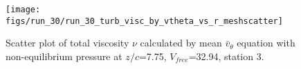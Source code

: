 \begin{figure}[H]
\centering
\texttt{[image: figs/run\_30/run\_30\_turb\_visc\_by\_vtheta\_vs\_r\_meshscatter]}
\caption{Scatter plot of total viscosity $\nu$ calculated by mean $\bar{v}_{\theta}$ equation with non-equilibrium pressure at $z/c$=7.75, $V_{free}$=32.94, station 3.}
\label{fig:run_30_turb_visc_by_vtheta_vs_r_meshscatter}
\end{figure}


